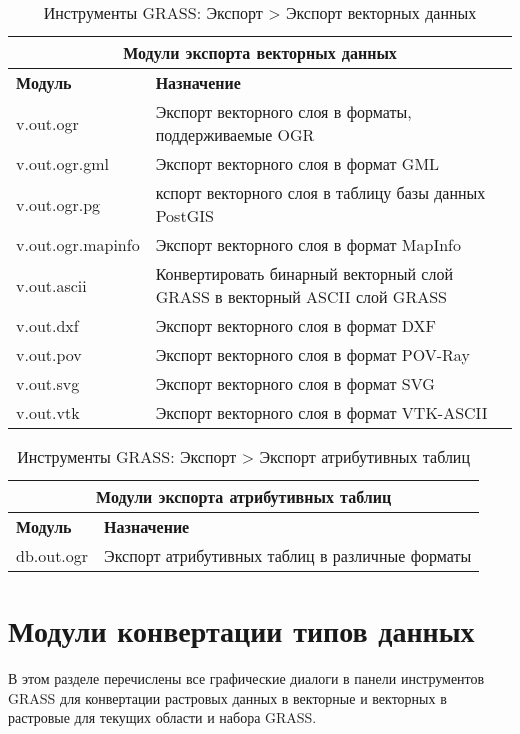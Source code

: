 {\renewcommand{\arraystretch}{0.7}
\begin{table}[H]
\centering
 \begin{tabular}{|p{4cm}|p{11cm}|}
  \hline \multicolumn{2}{|c|}{\textbf{Модули экспорта векторных данных}} \\
  \hline \textbf{Модуль} & \textbf{Назначение} \\
  \hline v.out.ogr & Экспорт векторного слоя в форматы, поддерживаемые OGR \\
  \hline v.out.ogr.gml & Экспорт векторного слоя в формат GML \\
  \hline v.out.ogr.pg & кспорт векторного слоя в таблицу базы данных
  PostGIS \\
  \hline v.out.ogr.mapinfo & Экспорт векторного слоя в формат MapInfo \\
  \hline v.out.ascii & Конвертировать бинарный векторный слой GRASS в
  векторный ASCII слой GRASS \\
  \hline v.out.dxf & Экспорт векторного слоя в формат DXF \\
  \hline v.out.pov & Экспорт векторного слоя в формат POV-Ray \\
  \hline v.out.svg & Экспорт векторного слоя в формат SVG \\
  \hline v.out.vtk & Экспорт векторного слоя в формат VTK-ASCII \\
\hline
\end{tabular}
\caption{Инструменты GRASS: Экспорт > Экспорт векторных данных}
\end{table}}

{\renewcommand{\arraystretch}{0.7}
\begin{table}[H]
\centering
 \begin{tabular}{|p{4cm}|p{11cm}|}
  \hline \multicolumn{2}{|c|}{\textbf{Модули экспорта атрибутивных таблиц}} \\
  \hline \textbf{Модуль} & \textbf{Назначение} \\
  \hline db.out.ogr & Экспорт атрибутивных таблиц в различные форматы \\
\hline
\end{tabular}
\caption{Инструменты GRASS: Экспорт > Экспорт атрибутивных таблиц}
\end{table}}


\section{Модули конвертации типов данных}

В этом разделе перечислены все графические диалоги в панели инструментов
GRASS для конвертации растровых данных в векторные и векторных в растровые
для текущих области и набора GRASS.

